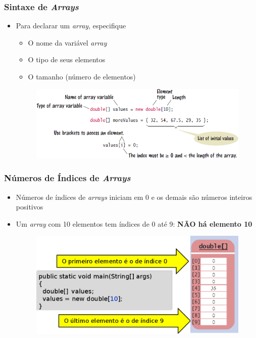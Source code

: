 \documentclass[xcolor={dvipsnames,table},aspectratio=169]{beamer}
\begin{document}
\begin{frame}\frametitle{Sintaxe de \emph{Arrays}}
\begin{itemize}
	\item Para declarar um \emph{array}, especifique
	\begin{itemize}
		\item O nome da variável \emph{array}
		\item O tipo de seus elementos
		\item O tamanho (número de elementos)
	\end{itemize}
\begin{figure}[h]
	\includegraphics[height=0.45\paperheight,center]{pucrs-ep-fprog-unidade_06-arrays-laminas-sintaxe.png}
\end{figure}
\end{itemize}
\end{frame}

\begin{frame}\frametitle{Números de Índices de \emph{Arrays}}
\begin{itemize}
	\item Números de índices de \emph{arrays} iniciam em 0 e os demais são números inteiros positivos
	\item Um \emph{array} com 10 elementos tem índices de 0 até 9: \textbf{NÃO há elemento 10}
\begin{figure}[h]
	\includegraphics[height=0.5\paperheight,center]{pucrs-ep-fprog-unidade_06-arrays-laminas-indices_de_arrays.png}
\end{figure}
\end{itemize}
\end{frame}
\end{document}
